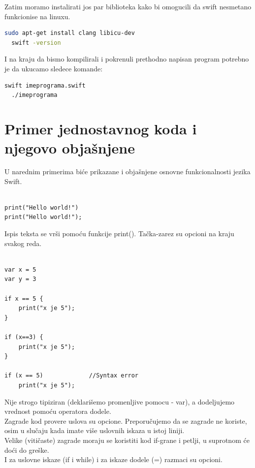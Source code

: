 \documentclass[a4paper]{article}
\begin{document}
Zatim moramo instalirati jos par biblioteka kako bi omogucili da swift nesmetano funkcionise na linuxu.


\begin{lstlisting}[language=bash]
  sudo apt-get install clang libicu-dev
  swift -version
\end{lstlisting}

I na kraju da bismo kompilirali i pokrenuli prethodno napisan program potrebno je da ukucamo sledece komande:

\begin{lstlisting}[language=bash]
  swift imeprograma.swift
  ./imeprograma
\end{lstlisting}



\newpage

\section{Primer jednostavnog koda i njegovo objašnjene}	
\label{sec:sestiDeo}

U narednim primerima biće prikazane i objašnjene osnovne funkcionalnosti jezika Swift.

\begin{lstlisting}[caption={},frame=single, label=simple]

print("Hello world!")
print("Hello world!");

\end{lstlisting}

Ispis teksta se vrši pomoću funkcije print(). Tačka-zarez su opcioni na kraju svakog reda.\\



\begin{lstlisting}[caption={},frame=single, label=simple]

var x = 5
var y = 3

if x == 5 {
	print("x je 5");
}

if (x==3) {
	print("x je 5");
}

if (x == 5)				//Syntax error
	print("x je 5");

\end{lstlisting}

Nije strogo tipiziran (deklarišemo promenljive pomocu - var), a dodeljujemo vrednost pomoću operatora dodele.\\
Zagrade kod provere uslova su opcione. Preporučujemo da se zagrade ne koriste, osim u slučaju kada imate više uslovnih iskaza u istoj liniji.\\
Velike (vitičaste) zagrade moraju se koristiti kod if-grane i petlji, u suprotnom će doći do greške.\\
I za uslovne iskaze (if i while) i za iskaze dodele (=) razmaci su opcioni.\\
\end{document}
